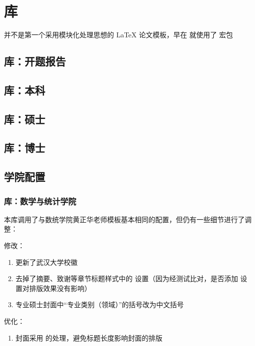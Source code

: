 
\chapter{库}

 并不是第一个采用模块化处理思想的 \LaTeX{} 论文模板，早在  就使用了  宏包

\section{ 库：开题报告}


\section{ 库：本科}


\section{ 库：硕士}


\section{ 库：博士}


\section{学院配置}

\subsection{ 库：数学与统计学院}

本库调用了与数统学院黄正华老师模板基本相同的配置，但仍有一些细节进行了调整：

修改：
\begin{enumerate}
  \item 更新了武汉大学校徽\cite{whulogo}
  \item 去掉了摘要、致谢等章节标题样式中的  设置（因为经测试比对，是否添加  设置对排版效果没有影响）
  \item 专业硕士封面中“专业类别（领域）”的括号改为中文括号
\end{enumerate}

优化：
\begin{enumerate}
  \item 封面采用  的处理，避免标题长度影响封面的排版
\end{enumerate}


